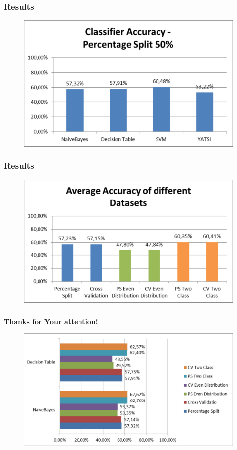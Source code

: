 \documentclass{beamer}
\begin{document}
\begin{frame}
\frametitle{Results}
	\begin{figure}
		\center
		\includegraphics[width=.8\textwidth]{./img/Accuracy_PS50.pdf}
	\end{figure}
\end{frame}
\begin{frame}
	\frametitle{Results}
	\begin{figure}
		\center
		\includegraphics[width=.8\textwidth]{./img/avgAccuracy.pdf}
	\end{figure}
\end{frame}
\begin{frame}
	\frametitle{}
	\centering
	{\Large \textbf{Thanks for Your attention!}}
\end{frame}
\begin{frame}
	\begin{figure}
		\center
		\includegraphics[width=.8\textwidth]{./img/Accuracy1.pdf}
		\end{figure}
\end{frame}
\end{document}

